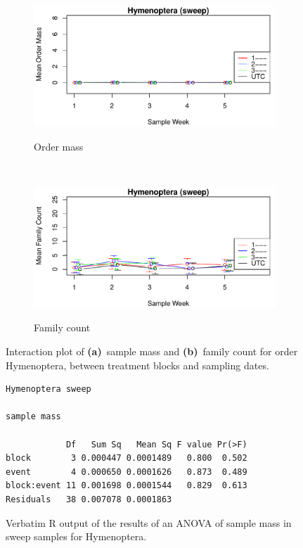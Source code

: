 \documentclass[10pt,letterpaper,twocolumn]{article}
\begin{document}
\begin{figure}[h]
	\centering
	\begin{subfigure}[b]{0.45\textwidth}
		\caption{Order mass}
		\includegraphics[width=\textwidth]{plots/blocks/interaction/mass/mass_sweep_Hymenoptera_interplot.pdf}
		\label{fig:sweep_hymenoptera_mass_interplot}
	\end{subfigure}
	~
	\begin{subfigure}[b]{0.45\textwidth}
		\caption{Family count}
		\includegraphics[width=\textwidth]{plots/blocks/interaction/family/family_sweep_Hymenoptera_interplot.pdf}
		\label{fig:sweep_hymenoptera_family_interplot}
	\end{subfigure}
	\caption{Interaction plot of \textbf{(a)}~sample mass and \textbf{(b)}~family count for order Hymenoptera, between treatment blocks and sampling dates.}
	\label{fig:sweep_hymenoptera_interplot}
	\smallskip
	\nointerlineskip
	\hrulefill
\end{figure}

\begin{figure}[h]
	\lstset{numbers=left}
	\lstset{xleftmargin=5mm,framexleftmargin=5mm}
	\begin{lstlisting}
Hymenoptera sweep 

sample mass 

            Df   Sum Sq   Mean Sq F value Pr(>F)
block        3 0.000447 0.0001489   0.800  0.502
event        4 0.000650 0.0001626   0.873  0.489
block:event 11 0.001698 0.0001544   0.829  0.613
Residuals   38 0.007078 0.0001863               
	\end{lstlisting}
	\caption{Verbatim R output of the results of an ANOVA of sample mass in sweep samples for Hymenoptera.}
	\label{fig:sweep_hymenoptera_mass_anova}
	\smallskip
	\nointerlineskip
	\hrulefill
\end{figure}
\end{document}
